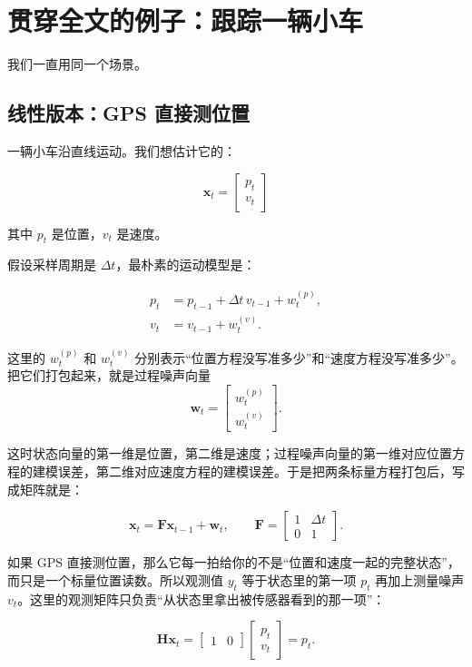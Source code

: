 \documentclass[12pt,a4paper]{ctexart}
\begin{document}
\section{贯穿全文的例子：跟踪一辆小车}

我们一直用同一个场景。

\subsection{线性版本：GPS 直接测位置}

一辆小车沿直线运动。我们想估计它的：

\[
\bm{x}_t =
\begin{bmatrix}
p_t\\
v_t
\end{bmatrix}
\]

其中 \(p_t\) 是位置，\(v_t\) 是速度。

假设采样周期是 \(\Delta t\)，最朴素的运动模型是：

\[
\begin{aligned}
p_t &= p_{t-1} + \Delta t\, v_{t-1} + w^{(p)}_t,\\
v_t &= v_{t-1} + w^{(v)}_t.
\end{aligned}
\]

这里的 \(w^{(p)}_t\) 和 \(w^{(v)}_t\) 分别表示“位置方程没写准多少”和“速度方程没写准多少”。把它们打包起来，就是过程噪声向量
\[
\bm{w}_t =
\begin{bmatrix}
w^{(p)}_t\\
w^{(v)}_t
\end{bmatrix}.
\]

这时状态向量的第一维是位置，第二维是速度；过程噪声向量的第一维对应位置方程的建模误差，第二维对应速度方程的建模误差。于是把两条标量方程打包后，写成矩阵就是：

\[
\bm{x}_t = \bm{F}\bm{x}_{t-1} + \bm{w}_t,
\qquad
\bm{F}=
\begin{bmatrix}
1 & \Delta t\\
0 & 1
\end{bmatrix}.
\]

如果 GPS 直接测位置，那么它每一拍给你的不是“位置和速度一起的完整状态”，而只是一个标量位置读数。所以观测值 \(y_t\) 等于状态里的第一项 \(p_t\) 再加上测量噪声 \(v_t\)。这里的观测矩阵只负责“从状态里拿出被传感器看到的那一项”：

\[
\bm{H}\bm{x}_t =
\begin{bmatrix}
1 & 0
\end{bmatrix}
\begin{bmatrix}
p_t\\
v_t
\end{bmatrix}
= p_t.
\]
\end{document}

